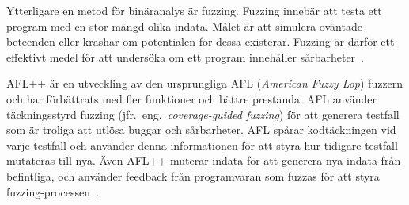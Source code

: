 Ytterligare en metod för binäranalys är fuzzing. Fuzzing innebär att testa ett
program med en stor mängd olika indata. Målet är att simulera oväntade beteenden
eller krashar om potentialen för dessa existerar. Fuzzing är därför ett
effektivt medel för att undersöka om ett program innehåller
sårbarheter~\cite{8371326}.

AFL++ är en utveckling av den ursprungliga AFL (\emph{American Fuzzy Lop}) fuzzern och
har förbättrats med fler funktioner och bättre prestanda. AFL använder
täckningsstyrd fuzzing (jfr.\ eng.\ \emph{coverage-guided fuzzing}) för att generera
testfall som är troliga att utlösa buggar och sårbarheter. AFL spårar
kodtäckningen vid varje testfall och använder denna informationen för att styra
hur tidigare testfall mutateras till nya. Även AFL++ muterar indata för att
generera nya indata från befintliga, och använder feedback från programvaran som
fuzzas för att styra fuzzing-processen~\cite{aflplusplus}.
